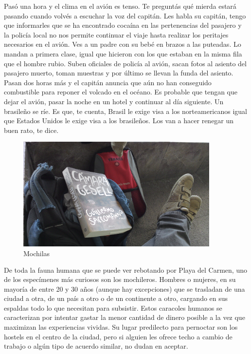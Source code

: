 \documentclass[12pt,twoside,openright,a5paper]{book}
\begin{document}
Pasó una hora y el clima en el avión es tenso. Te preguntás qué mierda
estará pasando cuando volvés a escuchar la voz del capitán. Les habla
su capitán, tengo que informarles que se ha encontrado cocaína en las
pertenencias del pasajero y la policía local no nos permite continuar el
viaje hasta realizar los peritajes necesarios en el avión. Ves a un padre
con su bebé en brazos a las puteadas. Lo mandan a primera clase, igual que
hicieron con los que estaban en la misma fila que el hombre rubio. Suben
oficiales de policía al avión, sacan fotos al asiento del pasajero muerto,
toman muestras y por último se llevan la funda del asiento. Pasan dos
horas más y el capitán anuncia que aún no han conseguido combustible para
reponer el volcado en el océano. Es probable que tengan que dejar el avión,
pasar la noche en un hotel y continuar al día siguiente. Un brasileño se
ríe. Es que, te cuenta, Brasil le exige visa a los norteamericanos igual
que Estados Unidos le exige visa a los brasileños. Los van a hacer renegar
un buen rato, te dice.


\vspace{0.5cm}
\hrulefill\hspace{0.2cm} \decofourleft\decofourright \hspace{0.2cm} \hrulefill
\vspace{0.5cm}

\begin{figure}[H]
  \centering
    \includegraphics[width=0.9\textwidth]{fotos/2013/mochila}
  \caption{Mochilas}
  \label{Mochilas}
\end{figure}

De toda la fauna humana que se puede ver rebotando por Playa del Carmen, uno
de los especímenes más curiosos son los mochileros. Hombres o mujeres,
en su mayoría de entre 20 y 30 años (aunque hay excepciones) que se
trasladan de una ciudad a otra, de un país a otro o de un continente a
otro, cargando en sus espaldas todo lo que necesitan para subsistir. Estos
caracoles humanos se caracterizan por intentar gastar la menor cantidad de
dinero posible a la vez que maximizan las experiencias vividas. Su lugar
predilecto para pernoctar son los hostels en el centro de la ciudad, pero
si alguien les ofrece techo a cambio de trabajo o algún tipo de acuerdo
similar, no dudan en aceptar.
\end{document}
